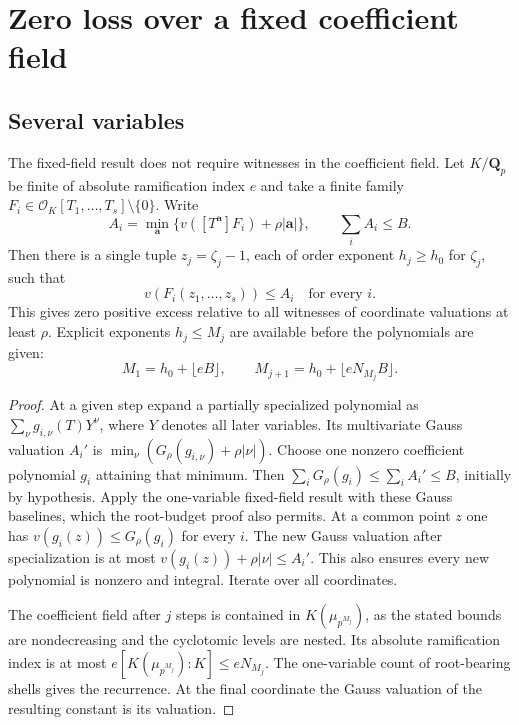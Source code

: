 \section{Zero loss over a fixed coefficient field}\label{sec:field}




\subsection*{Several variables}
The fixed-field result does not require witnesses in the coefficient field. Let $K/\mathbf Q_p$ be finite of absolute ramification index $e$ and take a finite family $F_i\in\mathcal O_K[T_1,\dots,T_s]\setminus\{0\}$. Write
\[
 A_i=\min_{\mathbf a}\{v([T^{\mathbf a}]F_i)+\rho|\mathbf a|\},
 \qquad \sum_i A_i\le B .
\]
Then there is a single tuple $z_j=\zeta_j-1$, each of order exponent $h_j\ge h_0$ for $\zeta_j$, such that
\[
                 v(F_i(z_1,\ldots,z_s))\le A_i\quad\text{for every }i.
\]
This gives zero positive excess relative to all witnesses of coordinate valuations at least $\rho$. Explicit exponents $h_j\le M_j$ are available before the polynomials are given:
\[
 M_1=h_0+\lfloor eB\rfloor,\qquad
 M_{j+1}=h_0+\lfloor e N_{M_j}B\rfloor.
\]

\begin{proof}
At a given step expand a partially specialized polynomial as
$\sum_{\nu} g_{i,\nu}(T)Y^\nu$, where $Y$ denotes all later variables. Its multivariate Gauss valuation $A_i'$ is $\min_\nu(G_\rho(g_{i,\nu})+\rho|\nu|)$. Choose one nonzero coefficient polynomial $g_i$ attaining that minimum. Then $\sum_i G_\rho(g_i)\le\sum_i A_i'\le B$, initially by hypothesis. Apply the one-variable fixed-field result with these Gauss baselines, which the root-budget proof also permits. At a common point $z$ one has $v(g_i(z))\le G_\rho(g_i)$ for every $i$. The new Gauss valuation after specialization is at most $v(g_i(z))+\rho|\nu|\le A_i'$. This also ensures every new polynomial is nonzero and integral. Iterate over all coordinates.

The coefficient field after $j$ steps is contained in $K(\mu_{p^{M_j}})$, as the stated bounds are nondecreasing and the cyclotomic levels are nested. Its absolute ramification index is at most $e[K(\mu_{p^{M_j}}):K]\le eN_{M_j}$. The one-variable count of root-bearing shells gives the recurrence. At the final coordinate the Gauss valuation of the resulting constant is its valuation.
\end{proof}

